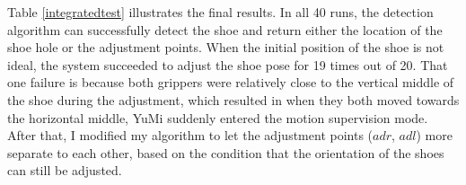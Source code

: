 \begin{table}[H]
\centering
{}
\caption{The testing results of integrated system}
\label{integratedtest}
\end{table}

Table \ref{integratedtest} illustrates the final results. In all 40 runs, the detection algorithm can successfully detect the shoe and return either the location of the shoe hole or the adjustment points. When the initial position of the shoe is not ideal, the system succeeded to adjust the shoe pose for 19 times out of 20. That one failure is because both grippers were relatively close to the vertical middle of the shoe during the adjustment, which resulted in when they both moved towards the horizontal middle, YuMi suddenly entered the motion supervision mode. After that, I modified my algorithm to let the adjustment points ($adr$, $adl$) more separate to each other, based on the condition that the orientation of the shoes can still be adjusted. 

